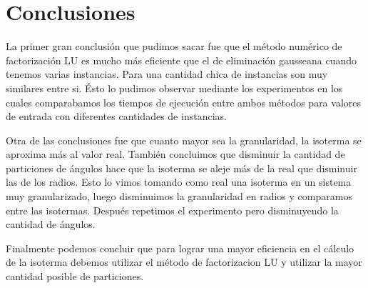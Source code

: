 \section{Conclusiones}

  La primer gran conclusión que pudimos sacar fue que el método numérico de factorización LU es mucho más eficiente que el de eliminación gausseana cuando tenemos varias instancias. Para una cantidad chica de instancias son muy similares entre si. Ésto lo pudimos observar mediante los experimentos en los cuales comparabamos los tiempos de ejecución entre ambos métodos para valores de entrada con diferentes cantidades de instancias. 

  Otra de las conclusiones fue que cuanto mayor sea la granularidad, la isoterma se aproxima más al valor real. También concluimos que disminuir la cantidad de particiones de ángulos hace que la isoterma se aleje más de la real que disminuir las de los radios. Esto lo vimos tomando como real una isoterma en un sistema muy granularizado, luego disminuimos la granularidad en radios y comparamos entre las isotermas. Después repetimos el experimento pero disminuyendo la cantidad de ángulos.

  Finalmente podemos concluir que para lograr una mayor eficiencia en el cálculo de la isoterma debemos utilizar el método de factorizacion LU y utilizar la mayor cantidad posible de particiones.
